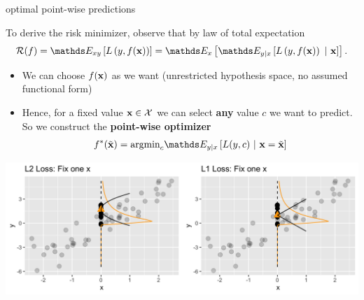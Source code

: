 \documentclass[11pt,compress,t,notes=noshow, xcolor=table]{beamer}
\begin{document}
\begin{frame}[t]{optimal point-wise predictions}  

To derive the risk minimizer, observe that by law of total expectation 
$$    \risk(f) = \E_{xy} \left[\Lxy\right] 
    = \E_x \left[\E_{y|x}\left[\Lxy~|~\xv\right]\right].$$

\begin{itemize}
	\item We can choose $f(\mathbf{x})$ as we want (unrestricted hypothesis space, no assumed functional form)
	\item Hence, for a fixed value $\mathbf{x} \in \mathcal{X}$ we can select \textbf{any} value $c$ we want to predict. So we construct the \textbf{point-wise optimizer} 
 $$\fbayes(\tilde{\xv}) = \mbox{argmin}_c \E_{y|x}\left[L(y, c)~|~ \xv = \tilde{\xv} \right] $$
\end{itemize}

\begin{center}
\includegraphics[width=1\textwidth]{figure/optimal_pointwise.png}
\end{center}


\end{frame}
\end{document}
